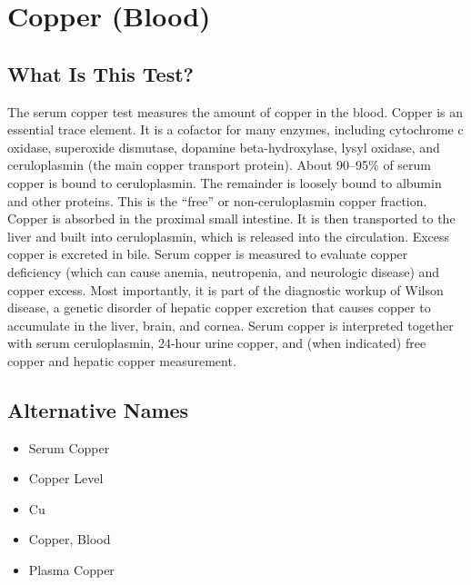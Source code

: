 \chapter{Copper (Blood)}

\section*{What Is This Test?}
The serum copper test measures the amount of copper in the blood. Copper is an essential trace element. It is a cofactor for many enzymes, including cytochrome c oxidase, superoxide dismutase, dopamine beta-hydroxylase, lysyl oxidase, and ceruloplasmin (the main copper transport protein). About 90--95\% of serum copper is bound to ceruloplasmin. The remainder is loosely bound to albumin and other proteins. This is the ``free'' or non-ceruloplasmin copper fraction. Copper is absorbed in the proximal small intestine. It is then transported to the liver and built into ceruloplasmin, which is released into the circulation. Excess copper is excreted in bile. Serum copper is measured to evaluate copper deficiency (which can cause anemia, neutropenia, and neurologic disease) and copper excess. Most importantly, it is part of the diagnostic workup of Wilson disease, a genetic disorder of hepatic copper excretion that causes copper to accumulate in the liver, brain, and cornea. Serum copper is interpreted together with serum ceruloplasmin, 24-hour urine copper, and (when indicated) free copper and hepatic copper measurement.

\section*{Alternative Names}
\begin{itemize}
  \item Serum Copper
  \item Copper Level
  \item Cu
  \item Copper, Blood
  \item Plasma Copper
\end{itemize}
